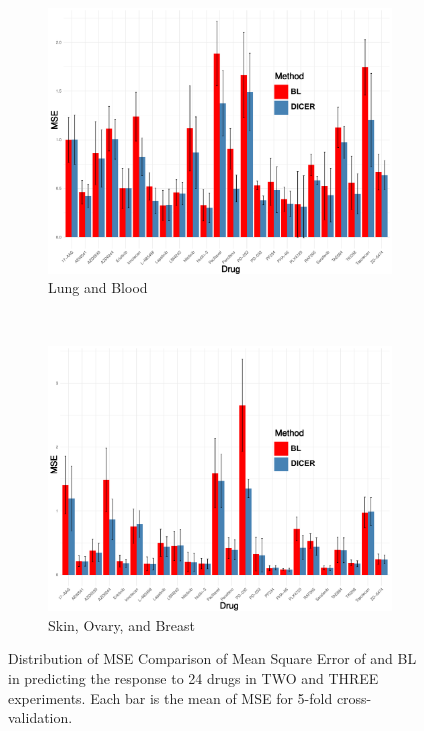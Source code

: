 	\begin{figure}
	\centering
	\begin{subfigure}[b]{0.22\textwidth}
		\includegraphics[width=\textwidth]{./img/lung-blood-barplot.pdf}
		\caption{Lung and Blood}\label{fig:two}
	\end{subfigure} ~
	\begin{subfigure}[b]{0.22\textwidth}
		\includegraphics[width=\textwidth]{./img/skin-ovary-breast.pdf}
		\caption{Skin, Ovary, and Breast}\label{fig:three}
	\end{subfigure}
	\squeezeup
	\caption{Distribution of MSE Comparison of Mean Square Error of \dc{} and BL in predicting the response to 24 drugs in TWO and THREE experiments. Each bar is the mean of MSE for 5-fold cross-validation.}
	\label{fig syn2}
\end{figure}

